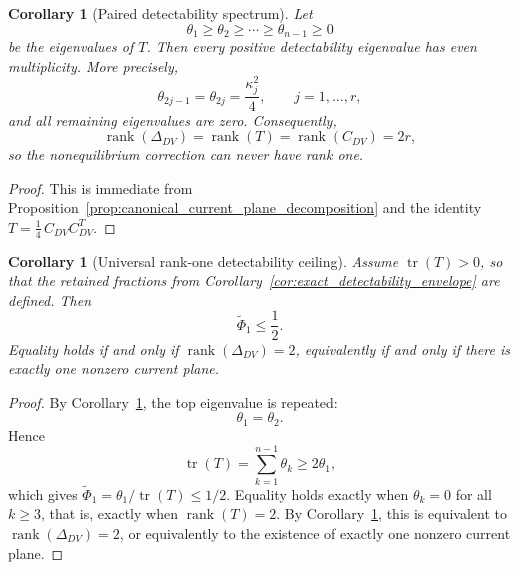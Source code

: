 \documentclass[11pt,a4paper]{article}
\numberwithin{equation}{section}
\theoremstyle{thmcompact}
\newtheorem{corollary}[theorem]{Corollary}
\theoremstyle{remark}
\begin{document}
\begin{corollary}[Paired detectability spectrum]
\label{cor:paired_detectability_spectrum}
Let
\begin{equation}
\theta_1\ge \theta_2\ge \cdots \ge \theta_{n-1}\ge 0
\end{equation}
be the eigenvalues of \(T\). Then every positive detectability eigenvalue has even multiplicity. More precisely,
\begin{equation}
\theta_{2j-1}=\theta_{2j}=\frac{\kappa_j^2}{4},
\qquad
j=1,\dots,r,
\end{equation}
and all remaining eigenvalues are zero. Consequently,
\begin{equation}
\operatorname{rank}(\Delta_{DV})
=
\operatorname{rank}(T)
=
\operatorname{rank}(C_{DV})
=
2r,
\end{equation}
so the nonequilibrium correction can never have rank one.
\end{corollary}

\begin{proof}
This is immediate from Proposition~\ref{prop:canonical_current_plane_decomposition} and the identity \(T=\frac14\,C_{DV}C_{DV}^T\).
\end{proof}

\begin{corollary}[Universal rank-one detectability ceiling]
\label{cor:universal_rank_one_detectability_ceiling}
Assume \(\operatorname{tr}(T)>0\), so that the retained fractions from Corollary~\ref{cor:exact_detectability_envelope} are defined. Then
\begin{equation}
\widetilde\Phi_1\le \frac12.
\end{equation}
Equality holds if and only if \(\operatorname{rank}(\Delta_{DV})=2\), equivalently if and only if there is exactly one nonzero current plane.
\end{corollary}

\begin{proof}
By Corollary~\ref{cor:paired_detectability_spectrum}, the top eigenvalue is repeated:
\begin{equation}
\theta_1=\theta_2.
\end{equation}
Hence
\begin{equation}
\operatorname{tr}(T)=\sum_{k=1}^{n-1}\theta_k\ge 2\theta_1,
\end{equation}
which gives \(\widetilde\Phi_1=\theta_1/\operatorname{tr}(T)\le 1/2\). Equality holds exactly when \(\theta_k=0\) for all \(k\ge 3\), that is, exactly when \(\operatorname{rank}(T)=2\). By Corollary~\ref{cor:paired_detectability_spectrum}, this is equivalent to \(\operatorname{rank}(\Delta_{DV})=2\), or equivalently to the existence of exactly one nonzero current plane.
\end{proof}
\end{document}
